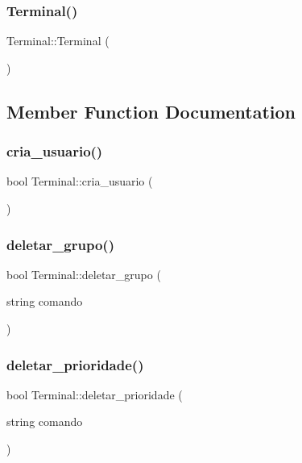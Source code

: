 \subsubsection{\texorpdfstring{Terminal()}{Terminal()}}
{\footnotesize\ttfamily Terminal\+::\+Terminal (\begin{DoxyParamCaption}{ }\end{DoxyParamCaption})}



\subsection{Member Function Documentation}
\mbox{\label{classTerminal_a7c4d6a98c2ae96474e6745ce0c18d459}} 
\subsubsection{\texorpdfstring{cria\+\_\+usuario()}{cria\_usuario()}}
{\footnotesize\ttfamily bool Terminal\+::cria\+\_\+usuario (\begin{DoxyParamCaption}{ }\end{DoxyParamCaption})}

\mbox{\label{classTerminal_a915f2d35fcd5452b57af7af9af496c1e}} 
\subsubsection{\texorpdfstring{deletar\+\_\+grupo()}{deletar\_grupo()}}
{\footnotesize\ttfamily bool Terminal\+::deletar\+\_\+grupo (\begin{DoxyParamCaption}\item[{string}]{comando }\end{DoxyParamCaption})}

\mbox{\label{classTerminal_ac3e557f2c92b1f3a28e7a1363cd002a5}} 
\subsubsection{\texorpdfstring{deletar\+\_\+prioridade()}{deletar\_prioridade()}}
{\footnotesize\ttfamily bool Terminal\+::deletar\+\_\+prioridade (\begin{DoxyParamCaption}\item[{string}]{comando }\end{DoxyParamCaption})}

